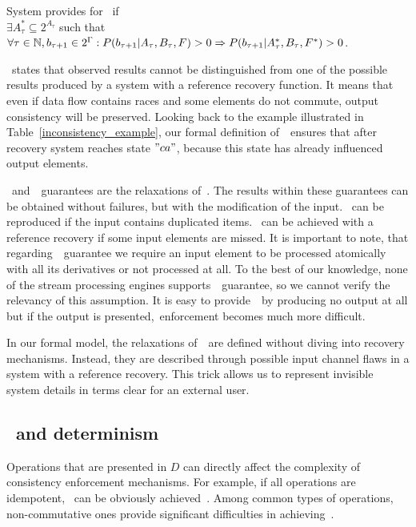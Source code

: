 \begin{definition}{System provides for~\alo}
if \\
$\exists{A^{*}_{\tau}\subseteq{2^{A_{\tau}}}}$ such that \\
$\forall{\tau \in \mathbb{N}, {b_{\tau+1} \in 2^{\Gamma}}}: P(b_{\tau+1}|A_{\tau},B_\tau,F)>0 \Rightarrow \\ P(b_{\tau+1}|A^{*}_{\tau},B_\tau,F^{*})>0$.
\end{definition}

\Eo\ states that observed results cannot be distinguished from one of the possible results produced by a system with a reference recovery function. It means that even if data flow contains races and some elements do not commute, output consistency will be preserved. Looking back to the example illustrated in Table~\ref{inconsistency_example}, our formal definition of~\eo\ ensures that after recovery system reaches state $"ca"$, because this state has already influenced output elements.

\Amo\ and~\alo\ guarantees are the relaxations of~\eo. The results within these guarantees can be obtained without failures, but with the modification of the input. \Alo\ can be reproduced if the input contains duplicated items. \Amo\ can be achieved with a reference recovery if some input elements are missed. It is important to note, that regarding~\amo\ guarantee we require an input element to be processed atomically with all its derivatives or not processed at all. To the best of our knowledge, none of the stream processing engines supports~\amo\ guarantee, so we cannot verify the relevancy of this assumption. It is easy to provide~\amo\ by producing no output at all but if the output is presented,\amo\ enforcement becomes much more difficult.  

In our formal model, the relaxations of~\eo\ are defined without diving into recovery mechanisms. Instead, they are described through possible input channel flaws in a system with a reference recovery. This trick allows us to represent invisible system details in terms clear for an external user.

\subsection{\Eo\ and determinism}

Operations that are presented in $D$ can directly affect the complexity of consistency enforcement mechanisms. For example, if all operations are idempotent, \eo\ can be obviously achieved~\cite{Akidau:2013:MFS:2536222.2536229}. Among common types of operations, non-commutative ones provide significant difficulties in achieving~\eo.

